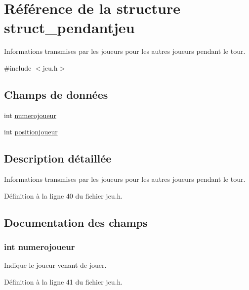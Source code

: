 \hypertarget{structstruct__pendantjeu}{\section{Référence de la structure struct\-\_\-pendantjeu}
\label{structstruct__pendantjeu}
}


Informations transmises par les joueurs pour les autres joueurs pendant le tour.  




{\ttfamily \#include $<$jeu.\-h$>$}

\subsection*{Champs de données}
\begin{DoxyCompactItemize}
\item 
int \hyperlink{structstruct__pendantjeu_a3e4028dc4a9077afc6e53e423343bd70}{numerojoueur}
\item 
int \hyperlink{structstruct__pendantjeu_a886601c5a72273d41b31c90740071a61}{positionjoueur}
\end{DoxyCompactItemize}


\subsection{Description détaillée}
Informations transmises par les joueurs pour les autres joueurs pendant le tour. 

Définition à la ligne 40 du fichier jeu.\-h.



\subsection{Documentation des champs}
\hypertarget{structstruct__pendantjeu_a3e4028dc4a9077afc6e53e423343bd70}{
\subsubsection[{numerojoueur}]{\setlength{\rightskip}{0pt plus 5cm}int numerojoueur}}\label{structstruct__pendantjeu_a3e4028dc4a9077afc6e53e423343bd70}
Indique le joueur venant de jouer. 

Définition à la ligne 41 du fichier jeu.\-h.

